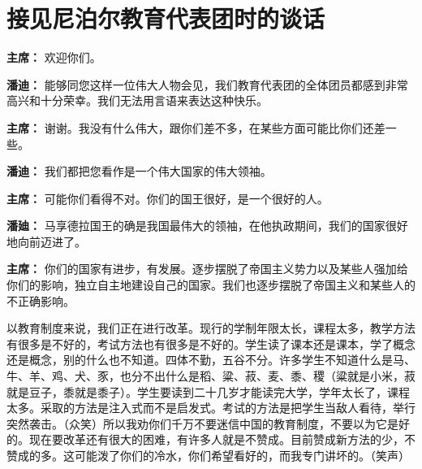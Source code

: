 \section[接见尼泊尔教育代表团时的谈话（一九六四年八月二十九日）]{接见尼泊尔教育代表团时的谈话}

\begin{list}{}{
    \setlength{\topsep}{0pt}        %
    \setlength{\partopsep}{0pt}     %
    \setlength{\parsep}{\parskip}   %
    \setlength{\itemsep}{\lineskip}       %
    \setlength{\labelsep}{0pt}%
    \setlength{\labelwidth}{3em}%
    \setlength{\itemindent}{0pt}%
    \setlength\listparindent{\parindent}
    \setlength{\leftmargin}{3em}
    \setlength{\rightmargin}{0pt}
    }
\item[\textbf{主席：}] 欢迎你们。

\item[\textbf{潘迪：}] 能够同您这样一位伟大人物会见，我们教育代表团的全体团员都感到非常高兴和十分荣幸。我们无法用言语来表达这种快乐。

\item[\textbf{主席：}] 谢谢。我没有什么伟大，跟你们差不多，在某些方面可能比你们还差一些。

\item[\textbf{潘迪：}] 我们都把您看作是一个伟大国家的伟大领袖。

\item[\textbf{主席：}] 可能你们看得不对。你们的国王很好，是一个很好的人。

\item[\textbf{潘廸：}] 马享德拉国王的确是我国最伟大的领袖，在他执政期间，我们的国家很好地向前迈进了。

\item[\textbf{主席：}] 你们的国家有进步，有发展。逐步摆脱了帝国主义势力以及某些人强加给你们的影响，独立自主地建设自己的国家。我们也逐步摆脱了帝国主义和某些人的不正确影响。

以教育制度来说，我们正在进行改革。现行的学制年限太长，课程太多，教学方法有很多是不好的，考试方法也有很多是不好的。学生读了课本还是课本，学了概念还是概念，别的什么也不知道。四体不勤，五谷不分。许多学生不知道什么是马、牛、羊、鸡、犬、豕，也分不出什么是稻、粱、菽、麦、黍、稷（粱就是小米，菽就是豆子，黍就是黍子）。学生要读到二十几岁才能读完大学，学年太长了，课程太多。采取的方法是注入式而不是启发式。考试的方法是把学生当敌人看待，举行突然袭击。（众笑）所以我劝你们千万不要迷信中国的教育制度，不要以为它是好的。现在要改革还有很大的困难，有许多人就是不赞成。目前赞成新方法的少，不赞成的多。这可能泼了你们的冷水，你们希望看好的，而我专门讲坏的。（笑声）


\end{list}
